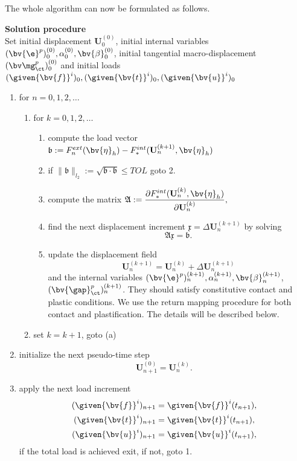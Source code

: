 The whole algorithm can now be formulated  as follows.

{\bf Solution procedure} \\
Set initial displacement $\mathbf{U}^{(0)}_{0}$, initial internal variables $(\bv{\e}^p)^{(0)}_0, \alpha^{(0)}_0, \bv{\beta}^{(0)}_0 $, initial tangential macro-displacement $(\bv \mg^p_{\ct})^{(0)}_0$ and initial loads $(\given{\bv{f}}^i)_0, (\given{\bv{t}}^i)_0, (\given{\bv{u}}^i)_0$
\begin{enumerate}
\item for $n=0,1,2,\dots$
  \begin{enumerate}
  \item for $k=0,1,2,\dots$
    \begin{enumerate}
    \item compute the load vector \\
          ${\mathfrak b} := F^{ext}_{n}(\bv{\eta}_h) - F^{int}_*(\mathbf{U}^{(k+1)}_{n} ,\bv{\eta}_h)$
    \item if $\| {\mathfrak b}\|_{l_2} := \sqrt{{\mathfrak b} \cdot {\mathfrak b}} \leq TOL$ goto 2.
    \item compute the matrix $\mathfrak  A := \dfrac{\partial F^{int}_* (\mathbf{U}^{(k)}_{n} ,\bv{\eta}_h)}{\partial \mathbf{U}^{(k)}_{n}},$
    \item find the next displacement increment $\mathfrak x = \Delta \mathbf{U}^{(k+1)}_{n}$ by solving
      \[
        \mathfrak  A \mathfrak x = {\mathfrak b}.
      \]
    \item update the displacement field
      \[
        \mathbf{U}^{(k+1)}_{n} = \mathbf{U}^{(k)}_{n} + \Delta \mathbf{U}^{(k+1)}_{n}
      \]
      and the internal variables $(\bv{\e}^p)^{(k+1)}_{n}, \alpha^{(k+1)}_{n}, \bv{\beta}^{(k+1)}_{n} $,
      $(\bv{\gap}^p_{\ct})^{(k+1)}_{n}$. 
      They should satisfy constitutive contact and plastic conditions. 
      We use the return mapping procedure for both contact and plastification. 
      The details will be described below.
    \end{enumerate}
    \item set $k=k+1$, goto (a)
  \end{enumerate}
  \item initialize the next pseudo-time step
  \[
     \mathbf{U}^{(0)}_{n+1} = \mathbf{U}^{(k)}_{n}.
  \]
  \item apply the next load increment
    \begin{align*}
    (\given{\bv{f}}^i)_{n+1} &= \given{\bv{f}}^i(t_{n+1}), \\
    (\given{\bv{t}}^i)_{n+1} &=  \given{\bv{t}}^i(t_{n+1}),\\
    (\given{\bv{u}}^i)_{n+1} &=  \given{\bv{u}}^i(t_{n+1}),
    \end{align*}
  if the total load is achieved exit, if not, goto 1.
\end{enumerate}


